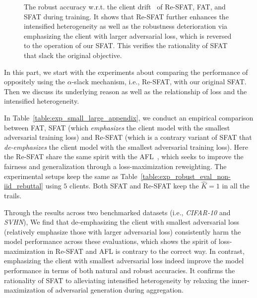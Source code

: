 \documentclass{article} %
\theoremstyle{plain}
\theoremstyle{definition}
\theoremstyle{remark}
\begin{document}
\begin{figure}[ht]
    \centering
    \caption{The robust accuracy w.r.t. the client drift~\citep{li2018federated} of Re-SFAT, FAT, and SFAT during training. It shows that Re-SFAT further enhances the intensified heterogeneity as well as the robustness deterioration via emphasizing the client with larger adversarial loss, which is reversed to the operation of our SFAT. This verifies the rationality of SFAT that slack the original objective.}
    \label{fig:client_drift_reverse}
\end{figure}

In this part, we start with the experiments about comparing the performance of oppositely using the $\alpha$-slack mechanism, i.e., Re-SFAT, with our original SFAT. Then we discuss its underlying reason as well as the relationship of loss and the intensified heterogeneity. 

In Table~\ref{table:exp_small_large_appendix}, we conduct an empirical comparison between FAT, SFAT (which \textit{emphasizes} the client model with the smallest adversarial training loss) and Re-SFAT (which is a contrary variant of SFAT that \textit{de-emphasizes} the client model with the smallest adversarial training loss). Here the Re-SFAT share the same spirit with the AFL~\citep{mohri2019agnostic}, which seeks to improve the fairness and generalization through a loss-maximization reweighting. The experimental setups keep the same as Table~\ref{table:exp_robust_eval_non-iid_rebuttal} using $5$ clients. Both SFAT and Re-SFAT keep the $\widehat{K}=1$ in all the trails.

Through the results across two benchmarked datasets (i.e., \textit{CIFAR-10} and \textit{SVHN}), We find that de-emphasizing the client with smallest adversarial loss (relatively emphasize those with larger adversarial loss) consistently harm the model performance across these evaluations, which shows the spirit of loss-maximization in Re-SFAT and AFL is contrary to the correct way. In contrast, emphasizing the client with smallest adversarial loss indeed improve the model performance in terms of both natural and robust accuracies. It confirms the rationality of SFAT to alleviating intensified heterogeneity by relaxing the inner-maximization of adversarial generation during aggregation. 
\end{document}

